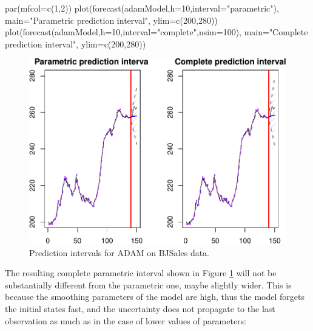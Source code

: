 \documentclass[
]{book}
\newenvironment{Shaded}{\begin{snugshade}}{\end{snugshade}}
\newcommand{\AttributeTok}[1]{\textcolor[rgb]{0.77,0.63,0.00}{#1}}
\newcommand{\DecValTok}[1]{\textcolor[rgb]{0.00,0.00,0.81}{#1}}
\newcommand{\FunctionTok}[1]{\textcolor[rgb]{0.00,0.00,0.00}{#1}}
\newcommand{\NormalTok}[1]{#1}
\newcommand{\StringTok}[1]{\textcolor[rgb]{0.31,0.60,0.02}{#1}}
\theoremstyle{definition}
\theoremstyle{definition}
\theoremstyle{definition}
\theoremstyle{definition}
\theoremstyle{remark}
\begin{document}
\begin{Shaded}
\begin{Highlighting}[]
\FunctionTok{par}\NormalTok{(}\AttributeTok{mfcol=}\FunctionTok{c}\NormalTok{(}\DecValTok{1}\NormalTok{,}\DecValTok{2}\NormalTok{))}
\FunctionTok{plot}\NormalTok{(}\FunctionTok{forecast}\NormalTok{(adamModel,}\AttributeTok{h=}\DecValTok{10}\NormalTok{,}\AttributeTok{interval=}\StringTok{"parametric"}\NormalTok{),}
     \AttributeTok{main=}\StringTok{"Parametric prediction interval"}\NormalTok{, }\AttributeTok{ylim=}\FunctionTok{c}\NormalTok{(}\DecValTok{200}\NormalTok{,}\DecValTok{280}\NormalTok{))}
\FunctionTok{plot}\NormalTok{(}\FunctionTok{forecast}\NormalTok{(adamModel,}\AttributeTok{h=}\DecValTok{10}\NormalTok{,}\AttributeTok{interval=}\StringTok{"complete"}\NormalTok{,}\AttributeTok{nsim=}\DecValTok{100}\NormalTok{),}
     \AttributeTok{main=}\StringTok{"Complete prediction interval"}\NormalTok{, }\AttributeTok{ylim=}\FunctionTok{c}\NormalTok{(}\DecValTok{200}\NormalTok{,}\DecValTok{280}\NormalTok{))}
\end{Highlighting}
\end{Shaded}

\begin{figure}
\centering
\includegraphics{Svetunkov--2022----ADAM_files/figure-latex/adamModelPIComplete-1.pdf}
\caption{\label{fig:adamModelPIComplete}Prediction intervals for ADAM on BJSales data.}
\end{figure}

The resulting complete parametric interval shown in Figure \ref{fig:adamModelPIComplete} will not be substantially different from the parametric one, maybe slightly wider. This is because the smoothing parameters of the model are high, thus the model forgets the initial states fast, and the uncertainty does not propagate to the last observation as much as in the case of lower values of parameters:
\end{document}
